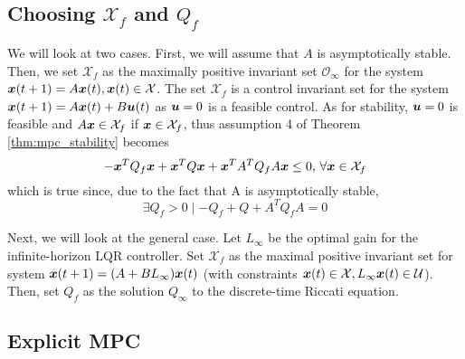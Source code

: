 \subsection{Choosing $\mathcal{X}_f$ and $Q_f$}

We will look at two cases. First, we will assume that $A$ is asymptotically stable. Then, we set $\mathcal{X}_f$ as the maximally positive invariant set $\mathcal{O}_\infty$ for the system $\bm{x}(t+1) = A \bm{x}(t), \bm{x}(t) \in \mathcal{X}$. The set $\mathcal{X}_f$ is a control invariant set for the system $\bm{x}(t+1) = A \bm{x}(t) + B \bm{u}(t)$ as $\bm{u}=0$ is a feasible control. As for stability, $\bm{u}=0$ is feasible and $A \bm{x} \in \mathcal{X}_f$ if $\bm{x} \in \mathcal{X}_f$, thus assumption 4 of Theorem \ref{thm:mpc_stability} becomes 
\begin{equation}
    -\bm{x}^T Q_f \bm{x} + \bm{x}^T Q \bm{x} + \bm{x}^T A^T Q_f A \bm{x} \leq 0, \, \forall \bm{x} \in \mathcal{X}_f
\end{equation}
which is true since, due to the fact that A is asymptotically stable, 
\begin{equation}
    \exists Q_f > 0 \mid - Q_f + Q + A^T Q_f A = 0
\end{equation}

Next, we will look at the general case. Let $L_\infty$ be the optimal gain for the infinite-horizon LQR controller. Set $\mathcal{X}_f$ as the maximal positive invariant set for system $\bm{x}(t+1) = (A + B L_\infty) \bm{x}(t)$ (with constraints $\bm{x}(t) \in \mathcal{X}, L_\infty \bm{x}(t) \in \mathcal{U}$). Then, set $Q_f$ as the solution $Q_\infty$ to the discrete-time Riccati equation. 

\subsection{Explicit MPC}

